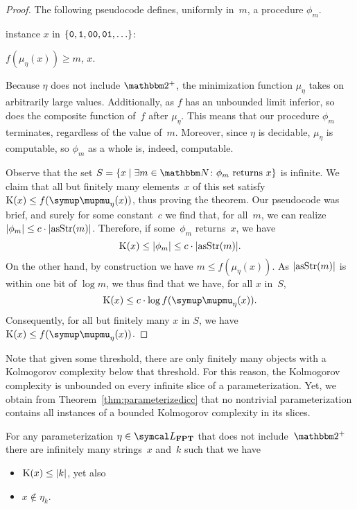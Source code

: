 \begin{proof}
  The following pseudocode defines, uniformly in~$m$, a procedure $\phi_m$.
  \begin{codelisting}
  \item
     instance $x$ in $\{\bits{0}, \bits{1}, \bits{00}, \bits{01}, \ldots\}$:
    \begin{codelisting}
      \item {} $f(\mu_\eta(x)) \ge m$,  $x$.
    \end{codelisting}
  \end{codelisting}

  Because $\eta$ does not include $\binary^+$, the minimization function $\mu_\eta$ takes on arbitrarily large values.
  Additionally, as $f$ has an unbounded limit inferior, so does the composite function of~$f$ after $\mu_\eta$.
  This means that our procedure $\phi_m$ terminates, regardless of the value of~$m$.
  Moreover, since $\eta$ is decidable, $\mu_\eta$ is computable, so $\phi_m$ as a whole is, indeed, computable.

  Observe that the set $S \deq \{x \st \exists m \in \bbN\colon \text{$\phi_m$ returns $x$}\}$ is infinite.
  We claim that all but finitely many elements~$x$ of this set satisfy $\KC(x) \le f(\mu_\eta(x))$, thus proving the theorem.
  Our pseudocode was brief, and surely for some constant~$c$ we find that, for all~$m$, we can realize ${\lvert\phi_m\rvert} \le c \cdot {\lvert\operatorname{asStr}(m)\rvert}$.
  Therefore, if some~$\phi_m$ returns~$x$, we have
  \begin{equation*}
    \operatorname{K}(x) \le {\lvert\phi_m\rvert} \le c \cdot {\lvert\operatorname{asStr}(m)\rvert}.
  \end{equation*}
  On the other hand, by construction we have $m \le f(\mu_\eta(x))$.
  As ${\lvert\operatorname{asStr}(m)\rvert}$ is within one bit of $\log m$, we thus find that we have, for all $x$ in~$S$,
  \begin{equation*}
    \KC(x) \le c \cdot \log f(\mu_\eta(x)).
  \end{equation*}
  Consequently, for all but finitely many $x$ in $S$, we have $\KC(x) \le f(\mu_\eta(x))$.
\end{proof}

Note that given some threshold, there are only finitely many objects with a Kolmogorov complexity below that threshold.
For this reason, the Kolmogorov complexity is unbounded on every infinite slice of a parameterization.
Yet, we obtain from Theorem~\ref{thm:parameterizedicc} that no nontrivial parameterization contains all instances of a bounded Kolmogorov complexity in its slices.
\begin{corollary}
\label{cor:parameterizedicc}%
  For any parameterization $\eta \in \calL_\cl{FPT}$ that does not include~$\binary^+$ there are infinitely many strings~$x$ and~$k$ such that we have
  \begin{itemize}
  \item $\operatorname{K}(x) \le {\lvert k\rvert}$, yet also
  \item $x \notin \eta_k$.
  \end{itemize}
\end{corollary}

